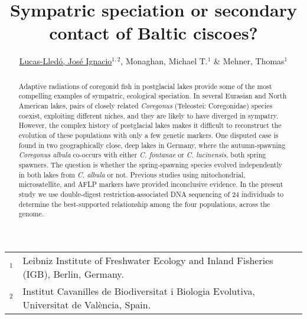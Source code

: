 \documentclass[a4paper,12pt]{article}
\author{\small \underline{Lucas-Lled\'o, Jos\'e Ignacio}$^{1,2}$, Monaghan, Michael T.$^1$ \& Mehner, Thomas$^1$}
\title{Sympatric speciation or secondary contact of Baltic ciscoes?}
\date{}
\begin{document}
\maketitle
\begin{center}
{\scriptsize
\begin{tabular}{ll}
$^1$&Leibniz Institute of Freshwater Ecology and Inland Fisheries (IGB), Berlin, Germany.\\
$^2$&Institut Cavanilles de Biodiversitat i Biologia Evolutiva, Universitat de València, Spain.\\
\end{tabular}
}
\end{center}
\begin{abstract}
Adaptive radiations of coregonid fish in postglacial lakes provide some of the most compelling examples of sympatric, ecological speciation. In several Eurasian and North American lakes, pairs of closely related \emph{Coregonus} (Teleostei: Coregonidae) species coexist, exploiting different niches, and they are likely to have diverged in sympatry. However, the complex history of postglacial lakes makes it difficult to reconstruct the evolution of these populations with only a few genetic markers. One disputed case is found in two geographically close, deep lakes in Germany, where the autumn-spawning \emph{Coregonus albula} co-occurs with either \emph{C. fontanae} or \emph{C. lucinensis}, both spring spawners. The question is whether the spring-spawning species evolved independently in both lakes from \emph{C. albula} or not. Previous studies using mitochondrial, microsatellite, and AFLP markers have provided inconclusive evidence. In the present study we use double-digest restriction-associated DNA sequencing of 24 individuals to determine the best-supported relationship among the four populations, across the genome.
\end{abstract}
\end{document}
